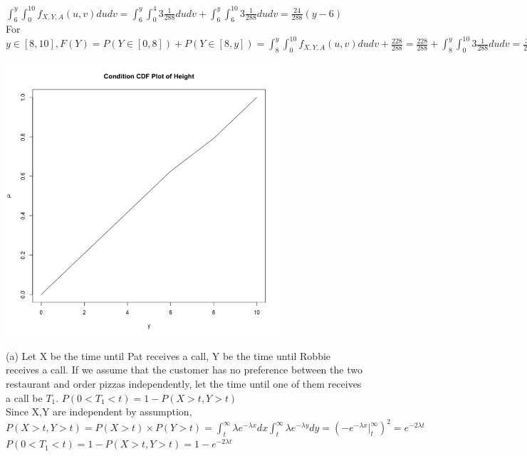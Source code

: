 \documentclass[11pt]{article}
\newenvironment{problem}[2][Problem]{\begin{trivlist}
\item[\hskip \labelsep {\bfseries #1}\hskip \labelsep {\bfseries #2.}]}{\end{trivlist}}
\begin{document}
$  \int_{6}^{y} \int_{0}^{10}  f_{X,Y,A}{(u,v)} du dv =  \int_{6}^{y} \int_{0}^{4} 3\frac{1}{288} du dv + \int_{6}^{y} \int_{6}^{10} 3\frac{1}{288} du dv = \frac{24}{288}(y-6) $\\
For $y \in [8,10], F(Y) = P(Y \in [0,8])+P(Y \in [8,y])  = \int_{8}^{y} \int_{0}^{10}  f_{X,Y,A}{(u,v)} du dv + \frac{228}{288}=  \frac{228}{288} +\int_{8}^{y} \int_{0}^{10}  3\frac{1}{288}dudv =  \frac{30}{288} (y - 8) + \frac{228}{288}$\\
 \begin{center}
 \includegraphics[height = 4in]{Q1_2}\\
 \end{center}
 
 \begin{problem}{2}
\end{problem}
(a) Let X be the time until Pat receives a call, Y be the time until Robbie receives a call. If we assume that the customer has no preference between the two restaurant and order pizzas independently, let the time until one of them receives a call be $T_1$. $P(0<T_1<t) = 1- P(X>t , Y>t)$\\
Since X,Y are independent by assumption, $P(X>t , Y>t) = P(X>t) \times P(Y>t) = \int_{t}^{\infty} \lambda e^{-\lambda x}dx  \int_{t}^{\infty} \lambda e^{-\lambda y}dy = (-e^{-\lambda x}|_t^\infty)^2 = e^{-2\lambda t}$\\
$P(0<T_1<t) = 1 - P(X>t , Y>t)  = 1 - e^{-2\lambda t }$\\
\end{document}
